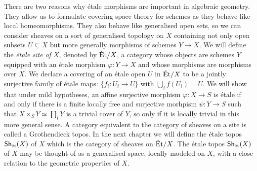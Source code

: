 There are two reasons why \'etale morphisms are important in algebraic geometry. They allow us to formulate covering space theory for schemes as they behave like local homeomorphisms. They also behave like generalised open sets, so we can consider sheaves on a sort of generalised topology on $X$ containing not only open subsets $U \subseteq X$ but more generally morphisms of schemes $Y \to X$. We will define the \textit{\'etale site of $X$}, denoted by $\text{\'Et}/X$, a category whose objects are schemes $Y$ equipped with an \'etale morphism $\varphi \colon Y \to X$ and whose morphisms are morphisms over $X$. We declare a covering of an \'etale open $U$ in $\text{\'Et}/X$ to be a jointly surjective family of \'etale maps: $\{f_i \colon U_i \to U\}$ with $\bigcup_i f(U_i) = U$. We will show that under mild hypotheses, an affine surjective morphism $\varphi \colon X \to S$ is \'etale if and only if there is a finite locally free and surjective morhpism $\psi \colon Y \to S$ such that $X \times_S Y \simeq \coprod_i Y$ is a trivial cover of $Y$, so only if it is locally trivial in this more general sense. A category equivalent to the category of sheaves on a site is called a Grothendieck topos. In the next chapter we will define the \'etale topos $\operatorname{\mathsf{Sh}}_{\text{\'et}}(X)$ of $X$ which is the category of sheaves on $\text{\'Et}/X$. The \'etale topos $\operatorname{\mathsf{Sh}}_{\text{\'et}}(X)$ of $X$ may be thought of as a generalised space, locally modeled on $X$, with a close relation to the geometric properties of $X$.



